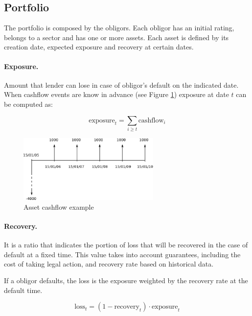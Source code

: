 \documentclass[a4paper,12pt,final]{article}
\begin{document}
\subsection{Portfolio}
The portfolio is composed by the obligors. Each obligor has an initial rating, 
belongs to a sector and has one or more assets. Each asset
is defined by its creation date, expected exposure and recovery at certain 
dates.

\paragraph{Exposure.} Amount that lender can lose in case of obligor's default 
on the indicated date. When cashflow events are know in advance (see Figure 
\ref{cashflow}) exposure at date $t$ can be computed as:

\begin{displaymath}
\mathrm{exposure}_{t} = \sum_{i \ge t} \mathrm{cashflow}_{i}
\end{displaymath}

\begin{figure}[!hbt]
\begin{center}
\includegraphics[width=7cm, angle=0]{./images/cashflow.eps}
\caption{Asset cashflow example}
\label{cashflow}
\end{center}
\end{figure}
\FloatBarrier

\paragraph{Recovery.} It is a ratio that indicates the portion of loss that will be recovered
in the case of default at a fixed time. This value takes into account guarantees, including 
the cost of taking legal action, and recovery rate based on historical data.
\newline

If a obligor defaults, the loss is the exposure weighted by the recovery rate at the 
default time.

\begin{displaymath}
\mathrm{loss}_{t} = (1 - \mathrm{recovery}_t) \cdot \mathrm{exposure}_t
\end{displaymath}
\end{document}
